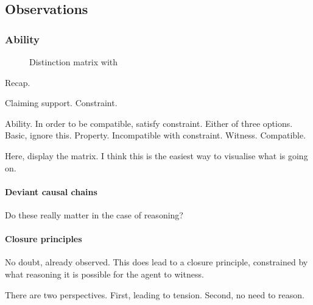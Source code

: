 \subsection{Observations}
\label{sec:overview:observations}

\subsubsection{Ability}

\begin{note}
  \begin{figure}[H]
    \centering
    \saMtxInterpreted{}
    \caption{Distinction matrix with }
    \label{fig:saMtxInterpreted:outline}
  \end{figure}
\end{note}

\begin{note}
  Recap.

  Claiming support.
  Constraint.

  Ability.
  In order to be compatible, satisfy constraint.
  Either of three options.
  Basic, ignore this.
  Property. Incompatible with constraint.
  Witness. Compatible.

  Here, display the matrix.
  I think this is the easiest way to visualise what is going on.
\end{note}

\paragraph{Deviant causal chains}

\begin{note}
  Do these really matter in the case of reasoning?
\end{note}

\paragraph{Closure principles}

\begin{note}
  No doubt, already observed.
  This does lead to a closure principle, constrained by what reasoning it is possible for the agent to witness.

  There are two perspectives.
  First, leading to tension.
  Second, no need to reason.
\end{note}

